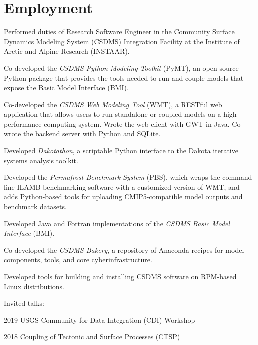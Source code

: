 \section{Employment}
\vspace{0.5em}

\begin{compactitem}[\itembullet]
  \item
    Performed duties of Research Software Engineer in the Community
    Surface Dynamics Modeling System (CSDMS) Integration Facility at
    the Institute of Arctic and Alpine Research (INSTAAR).
  \item
    Co-developed the \textit{CSDMS Python Modeling Toolkit} (PyMT), an
    open source Python package that provides the tools needed to run
    and couple models that expose the Basic Model Interface (BMI).
  \item
    Co-developed the \textit{CSDMS Web Modeling Tool} (WMT), a RESTful
    web application that allows users to run standalone or coupled
    models on a high-performance computing system. Wrote the web
    client with GWT in Java. Co-wrote the backend server with Python
    and SQLite.
  \item
    Developed \textit{Dakotathon}, a scriptable Python interface to
    the Dakota iterative systems analysis toolkit.
  \item    
    Developed the \textit{Permafrost Benchmark System} (PBS), which
    wraps the command-line ILAMB benchmarking software with a
    customized version of WMT, and adds Python-based tools for
    uploading CMIP5-compatible model outputs and benchmark datasets.
  \item
    Developed Java and Fortran implementations of the \textit{CSDMS
      Basic Model Interface} (BMI).
  \item
    Co-developed the \textit{CSDMS Bakery}, a repository of Anaconda recipes
    for model components, tools, and core cyberinfrastructure.
  \item
    Developed tools for building and installing CSDMS software on
    RPM-based Linux distributions.
  \item Invited talks:
    \begin{compactitem}[\itembullet]
      \item
        2019 USGS Community for Data Integration (CDI) Workshop
      \item
        2018 Coupling of Tectonic and Surface Processes (CTSP)

\end{compactitem}
\end{compactitem}
